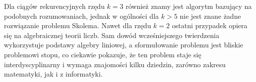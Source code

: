 \documentclass[leqno,10pt]{article}
\begin{document}
Dla ciągów rekurencyjnych rzędu $k=3$ również znamy jest algorytm bazujący na podobnych rozumowaniach, jednak w ogólności dla $k>5$ nie jest znane żadne rozwiązanie problemu Skolema. Nawet dla rzędu $k=2$ ostatni przypadek opiera się na algebraicznej teorii liczb. Sam dowód wcześniejszego twierdzenia wykorzystuje podstawy algebry liniowej, a sformułowanie problemu jest bliskie problemowi stopu, co ciekawie pokazuje, że ten problem staje się interdyscyplinarny i wymaga znajomości kilku dziedzin, zarówno zakresu matematyki, jak i z informatyki. 
\end{document}
